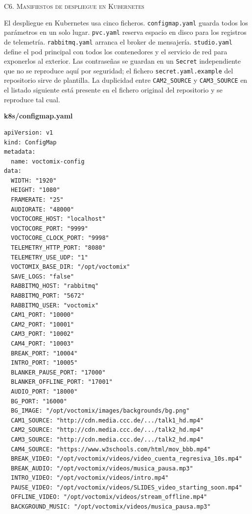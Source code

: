 \clearpage
\vspace{0.4cm}

\label{sec:anexoC6}%
\Large{\textsc{\textcolor{nar}{C6. Manifiestos de despliegue en Kubernetes}}}
\vspace{0.2cm}

\normalsize{El despliegue en Kubernetes usa cinco ficheros. \texttt{configmap.yaml} guarda
todos los parámetros en un solo lugar. \texttt{pvc.yaml} reserva espacio en disco para
los registros de telemetría. \texttt{rabbitmq.yaml} arranca el broker de mensajería.
\texttt{studio.yaml} define el pod principal con todos los contenedores y el servicio de
red para exponerlos al exterior. Las contraseñas se guardan en un \texttt{Secret}
independiente que no se reproduce aquí por seguridad; el fichero
\texttt{secret.yaml.example} del repositorio sirve de plantilla. La duplicidad entre
\texttt{CAM2\_SOURCE} y \texttt{CAM3\_SOURCE} en el listado siguiente está presente en el
fichero original del repositorio y se reproduce tal cual.}
\vspace{0.3cm}

\noindent\textbf{\small k8s/configmap.yaml}
\vspace{0.1cm}

\begin{lstlisting}[style=codefile, morecomment={[l]{\#}}]
apiVersion: v1
kind: ConfigMap
metadata:
  name: voctomix-config
data:
  WIDTH: "1920"
  HEIGHT: "1080"
  FRAMERATE: "25"
  AUDIORATE: "48000"
  VOCTOCORE_HOST: "localhost"
  VOCTOCORE_PORT: "9999"
  VOCTOCORE_CLOCK_PORT: "9998"
  TELEMETRY_HTTP_PORT: "8080"
  TELEMETRY_USE_UDP: "1"
  VOCTOMIX_BASE_DIR: "/opt/voctomix"
  SAVE_LOGS: "false"
  RABBITMQ_HOST: "rabbitmq"
  RABBITMQ_PORT: "5672"
  RABBITMQ_USER: "voctomix"
  CAM1_PORT: "10000"
  CAM2_PORT: "10001"
  CAM3_PORT: "10002"
  CAM4_PORT: "10003"
  BREAK_PORT: "10004"
  INTRO_PORT: "10005"
  BLANKER_PAUSE_PORT: "17000"
  BLANKER_OFFLINE_PORT: "17001"
  AUDIO_PORT: "18000"
  BG_PORT: "16000"
  BG_IMAGE: "/opt/voctomix/images/backgrounds/bg.png"
  CAM1_SOURCE: "http://cdn.media.ccc.de/.../talk1_hd.mp4"
  CAM2_SOURCE: "http://cdn.media.ccc.de/.../talk2_hd.mp4"
  CAM3_SOURCE: "http://cdn.media.ccc.de/.../talk2_hd.mp4"
  CAM4_SOURCE: "https://www.w3schools.com/html/mov_bbb.mp4"
  BREAK_VIDEO: "/opt/voctomix/videos/video_cuenta_regresiva_10s.mp4"
  BREAK_AUDIO: "/opt/voctomix/videos/musica_pausa.mp3"
  INTRO_VIDEO: "/opt/voctomix/videos/intro.mp4"
  PAUSE_VIDEO: "/opt/voctomix/videos/SLIDES_video_starting_soon.mp4"
  OFFLINE_VIDEO: "/opt/voctomix/videos/stream_offline.mp4"
  BACKGROUND_MUSIC: "/opt/voctomix/videos/musica_pausa.mp3"
\end{lstlisting}

